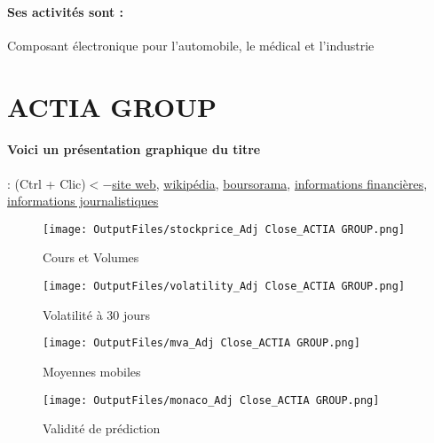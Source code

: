 \documentclass[11pt,a4paper]{report}%
\begin{document}
\paragraph{Ses activités sont : } Composant électronique pour l’automobile, le médical et l’industrie 
    
    \newpage

\section{ACTIA GROUP}

\paragraph{Voici un présentation graphique du titre} : (Ctrl + Clic)$<-$\href{https://www.actia.com/fr/}{site web}, \href{https://fr.wikipedia.org/wiki/Actia_Group}{wikipédia}, \href{https://www.boursorama.com/cours/1rPATI}{boursorama}, \href{https://www.qwant.com/?q=site:https:%2f%2fwww.easybourse.com%2faction-societe%2fACTIA-GROUP&t=web&client=ext-firefox-hp}{informations financières}, \href{https://bourse.lerevenu.com/cours-de-bourse/fiche-valeur-synthese/ACTIA-GROUP/ATI-FR}{informations journalistiques}
\begin{figure}[!htb]
   \begin{minipage}{0.5\textwidth}
     \centering
     \texttt{[image: OutputFiles/stockprice\_Adj Close\_ACTIA GROUP.png]}
     \caption{Cours et Volumes}\label{Fig:price_ACTIA GROUP}
   \end{minipage}\hfill
   \begin{minipage}{0.5\textwidth}
     \centering
     \texttt{[image: OutputFiles/volatility\_Adj Close\_ACTIA GROUP.png]}
     \caption{Volatilité à 30 jours}\label{Fig:volat_ACTIA GROUP}
   \end{minipage}
\end{figure}
\begin{figure}[!htb]
   \begin{minipage}{0.5\textwidth}
     \centering
     \texttt{[image: OutputFiles/mva\_Adj Close\_ACTIA GROUP.png]}
     \caption{Moyennes mobiles}\label{Fig:mva_ACTIA GROUP}
   \end{minipage}\hfill
   \begin{minipage}{0.5\textwidth}
     \centering
     \texttt{[image: OutputFiles/monaco\_Adj Close\_ACTIA GROUP.png]}
     \caption{Validité de prédiction}\label{Fig:prediction_ACTIA GROUP}
   \end{minipage}
\end{figure}
\end{document}
